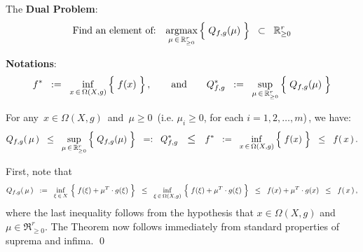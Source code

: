 \begin{definition}
\vskip 0.5cm
\noindent
The \textbf{Dual Problem}:
\begin{equation*}
\textnormal{Find an element of:}
\quad
	\underset{\mu\,\in\,\Re_{\geq 0}^{r}}{\argmax}\left\{\;
	\overset{{\color{white}.}}{Q_{f,g}(\mu)}
	\;\right\}
\;\; \subset \;\;
	\Re^{r}_{\geq 0}
\end{equation*}

\vskip 0.5cm
\noindent
\textbf{Notations}:
\begin{equation*}
f^{*}
\;\; := \;\;
	\underset{x\,\in\,\Omega(X,g)}{\inf}\left\{\;
		\overset{{\color{white}.}}{f(x)}
		\;\right\},
\quad\quad
\textnormal{and}
\quad\quad
Q_{f,g}^{*}
\;\; := \;\;
	\underset{\mu\,\in\,\Re_{\geq 0}^{r}}{\sup}\left\{\;
	\overset{{\color{white}.}}{Q_{f,g}(\mu)}
	\;\right\}
\end{equation*}
\end{definition}

\vskip 1.0cm
\begin{theorem}\label{WeakDuality}
\mbox{}
\vskip 0.1cm
\noindent
For any \,$x \in \Omega(X,g)$\, and \,$\mu \geq 0$\, (i.e. $\mu_{i} \geq 0$, for each $i =1,2,\ldots,m$)\,,
we have:
\begin{equation*}
Q_{f,g}\!\left(\,\mu\,\right)
\;\; \leq \;\;
	\underset{\mu\,\in\,\Re_{\geq 0}^{r}}{\sup}\left\{\;
		\overset{{\color{white}.}}{Q_{f,g}(\mu)}
		\;\right\}
\;\; =: \;\;
	Q_{f,g}^{*}
\quad\textnormal{\large$\leq$}\quad
	f^{*}
\;\; := \;\;
	\underset{x\,\in\,\Omega(X,g)}{\inf}\left\{\;
		\overset{{\color{white}.}}{f(x)}
		\;\right\}
\;\; \leq \;\;
	f(\,x\,)\,.
\end{equation*}
\end{theorem}
\proof
First, note that
\begin{equation*}
Q_{f,g}\!\left(\,\mu\,\right)
\;\; := \;\;
	\underset{\xi\,\in\,X}{\inf}\,\left\{\;f(\xi) \overset{{\color{white}.}}{+} \mu^{T}\cdot g(\xi)\;\right\}
\;\; \leq \;\;
	\underset{\xi\,\in\,\Omega(X,g)}{\inf}\,\left\{\;f(\xi) \overset{{\color{white}.}}{+} \mu^{T}\cdot g(\xi)\;\right\}
\;\; \leq \;\;
	f(x) \overset{{\color{white}.}}{+} \mu^{T}\cdot g(x)
\;\; \leq \;\;
	f(\,x\,)\,,
\end{equation*}
where the last inequality follows from the hypothesis that $x \in \Omega(X,g)$ and $\mu \in \Re_{\geq 0}^{r}$.
The Theorem now follows immediately from standard properties of suprema and infima.
\qed

